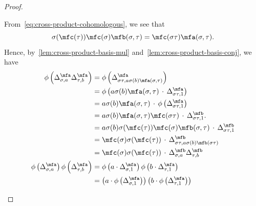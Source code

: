 \begin{proof}
\begin{enumerate}
            From~\cref{eq:cross-product-cohomologous}, we see that
            \[
            \sigma(\mfc(\tau))\mfc(\sigma)\mfb(\sigma,\tau) = \mfc(\sigma\tau)\mfa(\sigma,\tau).\]
            Hence, by~\cref{lem:cross-product-basis-mul} and~\cref{lem:cross-product-basis-conj}, we have
            \[
            \begin{aligned}
              \phi\left(\Delta^{\mfa}_{\sigma, a}\Delta^{\mfa}_{\tau, b}\right)
              &= \phi\left(
                \Delta^{\mfa}_{\sigma\tau, a \sigma(b) \mfa(\sigma,\tau)}
                \right)\\
              &= \phi\left(
                a\sigma(b) \mfa(\sigma,\tau) \,
                \cdot \,
                \Delta^{\mfa}_{\sigma\tau, 1}
                \right)\\
              &=
                a \sigma(b) \mfa(\sigma,\tau)
                \, \cdot \,
                \phi\left(\Delta^{\mfa}_{\sigma\tau, 1}\right) \\
              &=
                a \sigma(b) \mfa(\sigma,\tau) \mfc(\sigma\tau)
                \, \cdot \,
                \Delta^{\mfb}_{\sigma\tau, 1}.\\
              &=
                a\sigma(b)\sigma(\mfc(\tau))\mfc(\sigma)\mfb(\sigma,\tau)
                \, \cdot \,
                \Delta^{\mfb}_{\sigma\tau, 1}\\
              &=
                \mfc(\sigma) \sigma(\mfc(\tau))
                \,\cdot\,
                \Delta^{\mfb}_{\sigma\tau,a\sigma(b)\mfb(\sigma\tau)}\\
              &=
                \mfc(\sigma)\sigma(\mfc(\tau))
                \, \cdot \,
                \Delta^{\mfb}_{\sigma, a}\Delta^{\mfb}_{\tau, b}
              \\
              \phi\left(\Delta^{\mfa}_{\sigma, a}\right)\phi\left(\Delta^{\mfa}_{\tau, b}\right)
              &= \phi\left(a \cdot \Delta^{\mfa}_{\sigma, 1}\right) \phi\left(b\cdot \Delta^{\mfa}_{\tau, 1}\right) \\
              &= \left(a \cdot \phi\left(\Delta^{\mfa}_{\sigma, 1}\right)\right)
                \left(b \cdot \phi\left(\Delta^{\mfa}_{\tau, 1}\right)\right) \\

\end{aligned}\]
\end{enumerate}
\end{proof}
